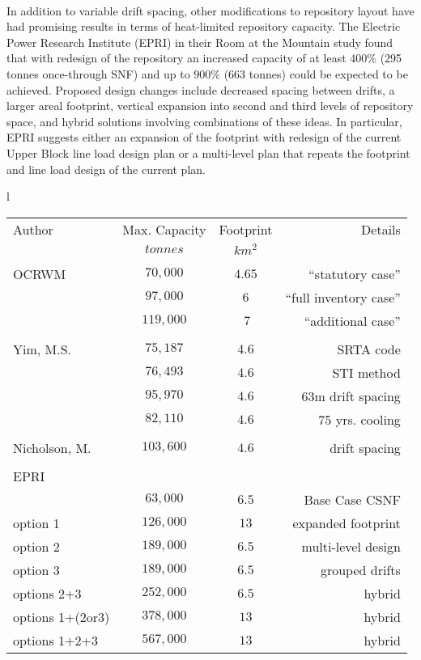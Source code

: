 \paragraph{}
In addition to variable drift spacing, other modifications to repository layout have had promising 
results in terms of heat-limited repository capacity. The Electric Power Research Institute (EPRI) 
in their Room at the Mountain study found that with redesign of the repository an increased capacity 
of at least $400\%$ (295 tonnes once-through SNF) and up to $900\%$ (663 tonnes) could be expected 
to be achieved. Proposed design changes include decreased spacing between drifts, a larger areal 
footprint, vertical expansion into second and third levels of repository space, and hybrid solutions 
involving combinations of these ideas. In particular, EPRI suggests either an expansion of the 
footprint with redesign of the current Upper Block line load design plan or a multi-level plan that 
repeats the footprint and line load design of the current plan.\cite{kessler_room_2006}
\begin{centering}
\begin{tabular}{l}
\\
\begin{tabular}{l|c|c|r}
Author&Max. Capacity&Footprint&Details\\
&$tonnes$&$km^2$&\\
\hline
&&&\\
OCRWM&$70,000$&$4.65$&``statutory case''\\
&$97,000$&$6$&``full inventory case''\\
&$119,000$&$~7$&``additional case''\\
\hline
&&&\\
Yim, M.S.&$75,187$&$4.6$&SRTA code\\
&$76,493$&$4.6$&STI method\\
&$95,970$&$4.6$&$63$m drift spacing\\
&$82,110$&$4.6$&75 yrs. cooling\\
\hline
&&&\\
Nicholson, M.&$103,600$&$4.6$&drift spacing\\
\hline
&&&\\
EPRI&&&\\
&$63,000$&$6.5$&Base Case CSNF\\
option 1&$126,000$&$13$&expanded footprint\\
option 2&$189,000$&$6.5$&multi-level design\\
option 3&$189,000$&$6.5$&grouped drifts\\
options 2+3&$252,000$&$6.5$&hybrid\\
options 1+(2or3) &$378,000$&$13$&hybrid\\
options 1+2+3 &$567,000$&$13$&hybrid\\
\hline

\end{tabular}
\end{tabular}
\end{centering}

